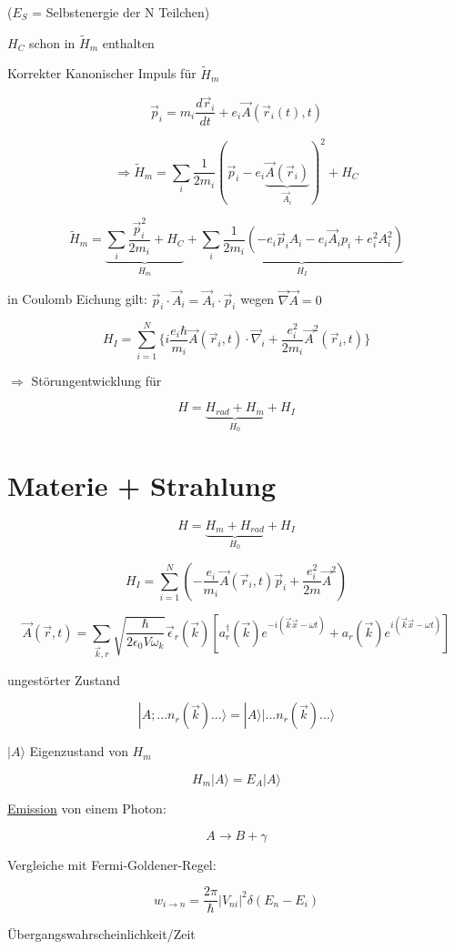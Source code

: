 (\(E_S\) = Selbstenergie der N Teilchen)

\(H_C\) schon in \(\tilde H_m\) enthalten

Korrekter Kanonischer Impuls für \(\tilde H_m\)

\[\vec p_i = m_i\frac{d\vec r_i}{dt}+e_i\vec A(\vec r_i(t),t)\]

\[\Rightarrow \tilde H_m = \sum_i\frac{1}{2m_i}(\vec p_i-e_i\underbrace{\vec A(\vec r_i)}_{\vec A_i})^2+H_C\]


\[\tilde H_m = \underbrace{\sum_i \frac{\vec p_i^2}{2m_i}+H_C}_{H_m} + \underbrace{\sum_i \frac{1}{2m_i}(-e_i\vec p_i A_i-e_i\vec A_ip_i+e^2_iA^2_i)}_{H_I}\]

in Coulomb Eichung gilt: \(\vec p_i\cdot\vec A_i = \vec A_i\cdot\vec p_i\) wegen \(\vec\nabla\vec A = 0\)

\[H_I = \sum_{i=1}^N \{ i\frac{e_i\hbar}{m_i}\vec A(\vec r_i,t)\cdot\vec\nabla_i + \frac{ e^2_i}{2m_i}\vec A^2(\vec r_i,t) \}\]

\(\Rightarrow \) Störungentwicklung für

\[H = \underbrace{H_{rad}+H_m}_{H_0} + H_I\]


\section{Materie + Strahlung}

\[H = \underbrace{H_m+H_{rad}}_{H_0}+H_I\]

\[H_I = \sum_{i=1}^{N}(-\frac{e_i}{m_i}\vec A(\vec r_i,t)\vec p_i + \frac{e_i^2}{2m}\vec A^2)\]

\[\vec A(\vec r,t) =\sum_{\vec k,r}\sqrt{\frac{\hbar}{2\epsilon_0V\omega_k}}\vec\epsilon_r(\vec k)[a^\dagger_r(\vec k) e^{-i(\vec k\vec x-\omega t)}+a_r(\vec k) e^{i(\vec k\vec x-\omega t)} ]\]

ungestörter Zustand

\[|A;...n_r(\vec k) ...\rangle  = |A\rangle |...n_r(\vec k)...\rangle \]


\(|A\rangle \) Eigenzustand von \(H_m\)

\[H_m|A\rangle  = E_A|A\rangle \]

\underline{Emission} von einem Photon:

\[A\rightarrow B+\gamma\]

Vergleiche mit Fermi-Goldener-Regel:

\[ w_{i \to n} = \frac{2\pi}{\hbar}|V_{ni}|^2\delta(E_n-E_i)  \]

Übergangswahrscheinlichkeit/Zeit 

